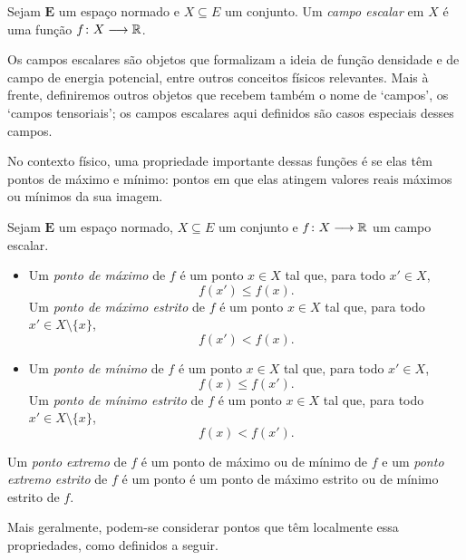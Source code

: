 \begin{definition}
Sejam $\bm E$ um espaço normado e $X \subseteq E$ um conjunto. Um \emph{campo escalar} em $X$ é uma função $f\colon \allowbreak X \longrightarrow \mathbb{R}$.
\end{definition}

Os campos escalares são objetos que formalizam a ideia de função densidade e de campo de energia potencial, entre outros conceitos físicos relevantes. Mais à frente, definiremos outros objetos que recebem também o nome de `campos', os `campos tensoriais'; os campos escalares aqui definidos são casos especiais desses campos.

No contexto físico, uma propriedade importante dessas funções é se elas têm pontos de máximo e mínimo: pontos em que elas atingem valores reais máximos ou mínimos da sua imagem.

\begin{definition}
Sejam $\bm E$ um espaço normado, $X \subseteq E$ um conjunto e $f\colon \allowbreak X \longrightarrow \mathbb{R}$ um campo escalar.
	\begin{itemize}
	\item Um \emph{ponto de máximo} de $f$ é um ponto $x \in X$ tal que, para todo $x' \in X$,
		\begin{equation*}
		f(x') \leq f(x).
		\end{equation*}
	Um \emph{ponto de máximo estrito} de $f$ é um ponto $x \in X$ tal que, para todo $x' \in X \setminus \{x\}$,
		\begin{equation*}
		f(x') < f(x).
		\end{equation*}
	\item Um \emph{ponto de mínimo} de $f$ é um ponto $x \in X$ tal que, para todo $x' \in X$,
		\begin{equation*}
		f(x) \leq f(x').
		\end{equation*}
	Um \emph{ponto de mínimo estrito} de $f$ é um ponto $x \in X$ tal que, para todo $x' \in X \setminus \{x\}$,
		\begin{equation*}
		f(x) < f(x').
		\end{equation*}
	\end{itemize}
Um \emph{ponto extremo} de $f$ é um ponto de máximo ou de mínimo de $f$ e um \emph{ponto extremo estrito} de $f$ é um ponto é um ponto de máximo estrito ou de mínimo estrito de $f$.
\end{definition}

Mais geralmente, podem-se considerar pontos que têm localmente essa propriedades, como definidos a seguir.

